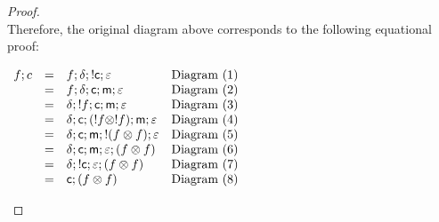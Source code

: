 \begin{proof}
  \ \\\noindent
  Therefore, the original diagram above corresponds to the following
  equational proof:
  \begin{center}
    \begin{math}
      \begin{array}{llllll}
        f;c
        & = & f;\delta;!\mathsf{c};\varepsilon                  & \text{Diagram }(1)\\
        & = & f;\delta;\mathsf{c};\mathsf{m};\varepsilon               & \text{Diagram }(2)\\
        & = & \delta;!f;\mathsf{c};\mathsf{m};\varepsilon              & \text{Diagram }(3)\\
        & = & \delta;\mathsf{c};(!f \otimes !f);\mathsf{m};\varepsilon & \text{Diagram }(4)\\
        & = & \delta;\mathsf{c};\mathsf{m};!(f \otimes f);\varepsilon  & \text{Diagram }(5)\\
        & = & \delta;\mathsf{c};\mathsf{m};\varepsilon;(f \otimes f)   & \text{Diagram }(6)\\
        & = & \delta;!\mathsf{c};\varepsilon;(f \otimes f)      & \text{Diagram }(7)\\
        & = & \mathsf{c};(f \otimes f)                          & \text{Diagram }(8)\\
      \end{array}
    \end{math}
  \end{center}
\end{proof}
